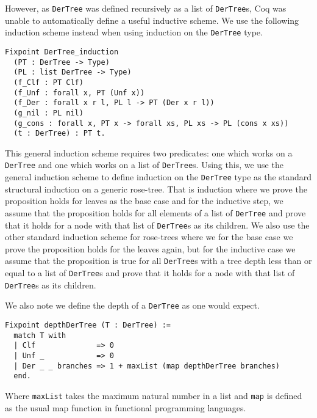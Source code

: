 \documentclass{llncs}
\begin{document}
However, as \verb+DerTree+ was defined recursively as a list of
\verb+DerTree+s, Coq was unable to automatically define a useful inductive
scheme. We use the following induction scheme instead when using induction on
the \verb+DerTree+ type.
%
\begin{verbatim}
Fixpoint DerTree_induction
  (PT : DerTree -> Type)
  (PL : list DerTree -> Type)
  (f_Clf : PT Clf)
  (f_Unf : forall x, PT (Unf x))
  (f_Der : forall x r l, PL l -> PT (Der x r l))
  (g_nil : PL nil)
  (g_cons : forall x, PT x -> forall xs, PL xs -> PL (cons x xs))
  (t : DerTree) : PT t.
\end{verbatim}
%
This general induction scheme requires two predicates: one which works on a
\verb+DerTree+ and one which works on a list of \verb+DerTree+s. Using this,
we use the general induction scheme to define induction on the \verb+DerTree+
type as the standard structural induction on a generic rose-tree. That is 
induction where we prove the proposition holds for leaves as the base case and
for the inductive step, we assume that the proposition holds for all elements
of a list of \verb+DerTree+ and prove that it holds for a node with that list
of \verb+DerTree+s as its children. We also use the other standard induction
scheme for rose-trees where we for the base case we prove the proposition holds
for the leaves again, but for the inductive case we assume that the proposition
is true for all \verb+DerTree+s with a tree depth less than or equal to a list
of \verb+DerTree+s and prove that it holds for a node with that list of
\verb+DerTree+s as its children.

We also note we define the depth of a \verb+DerTree+ as one would expect.
%
\begin{verbatim}
Fixpoint depthDerTree (T : DerTree) :=
  match T with
  | Clf              => 0
  | Unf _            => 0
  | Der _ _ branches => 1 + maxList (map depthDerTree branches)
  end.
\end{verbatim}
%
Where \verb+maxList+ takes the maximum natural number in a list and \verb+map+
is defined as the usual map function in functional programming languages.
%
\end{document}
